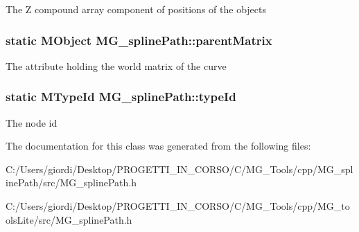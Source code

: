 The Z compound array component of positions of the objects \hypertarget{class_m_g__spline_path_a88eb65ce7530bf0ec2bbd3e371a58d51}{
\subsubsection[{parent\-Matrix}]{\setlength{\rightskip}{0pt plus 5cm}static M\-Object M\-G\-\_\-spline\-Path\-::parent\-Matrix\hspace{0.3cm}{\ttfamily [static]}}}\label{class_m_g__spline_path_a88eb65ce7530bf0ec2bbd3e371a58d51}
The attribute holding the world matrix of the curve \hypertarget{class_m_g__spline_path_aff30815f4dc3c17f42cfb5707069e478}{
\subsubsection[{type\-Id}]{\setlength{\rightskip}{0pt plus 5cm}static M\-Type\-Id M\-G\-\_\-spline\-Path\-::type\-Id\hspace{0.3cm}{\ttfamily [static]}}}\label{class_m_g__spline_path_aff30815f4dc3c17f42cfb5707069e478}
The node id 

The documentation for this class was generated from the following files\-:\begin{DoxyCompactItemize}
\item 
C\-:/\-Users/giordi/\-Desktop/\-P\-R\-O\-G\-E\-T\-T\-I\-\_\-\-I\-N\-\_\-\-C\-O\-R\-S\-O/\-C/\-M\-G\-\_\-\-Tools/cpp/\-M\-G\-\_\-spline\-Path/src/M\-G\-\_\-spline\-Path.\-h\item 
C\-:/\-Users/giordi/\-Desktop/\-P\-R\-O\-G\-E\-T\-T\-I\-\_\-\-I\-N\-\_\-\-C\-O\-R\-S\-O/\-C/\-M\-G\-\_\-\-Tools/cpp/\-M\-G\-\_\-tools\-Lite/src/M\-G\-\_\-spline\-Path.\-h\end{DoxyCompactItemize}
